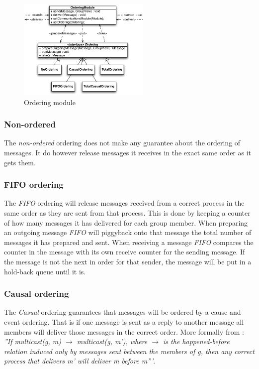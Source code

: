 \documentclass[titlepage, twocolumn, a4paper, 10pt]{article}
\begin{document}
\begin{figure}[!thb]
  \centering
  \includegraphics[width=2.5in]{images/Ordering.pdf}
  \caption{Ordering module}
  \label{fig:images/ordering}
\end{figure}

\subsubsection{Non-ordered}\label{sec:-non-ordered}
The \textit{non-ordered} ordering does not make any guarantee about
the ordering of messages. It do however release messages it receives
in the exact same order as it gets them.

\subsubsection{FIFO ordering}\label{sec:fifo}
The \textit{FIFO} ordering will release messages received from a
correct process in the same order as they are sent from that process.
This is done by keeping a counter of how many messages it has
delivered for each group member. When preparing an outgoing message
\textit{FIFO} will piggyback onto that message the total number of
messages it has prepared and sent. When receiving a message
\textit{FIFO} compares the counter in the message with its own receive
counter for the sending message. If the message is not the next in
order for that sender, the message will be put in a hold-back queue
until it is.

\subsubsection{Causal ordering}\label{sec:causal}
The \textit{Casual} ordering guarantees that messages will be ordered
by a cause and event ordering. That is if one message is sent as a
reply to another message all members will deliver those messages in
the correct order. More formally from \cite{book:dist-syst}:
\textit{''If multicast(g, m) $\rightarrow$ multicast(g, m'), where
  $\rightarrow$ is the happened-before relation induced only by
  messages sent between the members of g, then any correct process
  that delivers m' will deliver m before m'''}.
\end{document}
